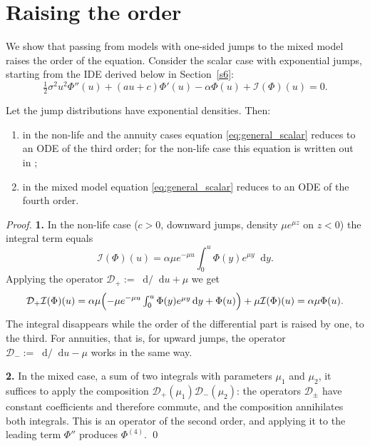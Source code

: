 \documentclass[smallextended]{svjour3}
\newcommand{\diff}{\mathop{}\!\mathrm{d}}
\begin{document}
\section{Raising the order}
\label{s4}

We show that passing from models with one-sided jumps to the mixed model
raises the order of the equation. Consider the scalar case with exponential
jumps, starting from the IDE derived below in Section~\ref{s6}:
\begin{equation}
    \label{eq:general_scalar}
    \tfrac12\sigma^2u^2\Phi''(u)+(au+c)\Phi'(u)-\alpha\Phi(u)
    +\mathcal I(\Phi)(u)=0.
\end{equation}

\begin{proposition}
\label{prop:order}
Let the jump distributions have exponential densities. Then:
\begin{enumerate}
\item in the non-life and the annuity cases equation \eqref{eq:general_scalar}
reduces to an ODE of the third order; for the non-life case this equation is
written out in \cite[\S\,5]{AntipovKabanov};
\item in the mixed model equation \eqref{eq:general_scalar} reduces to an ODE
of the fourth order.
\end{enumerate}
\end{proposition}

\begin{proof}
\textbf{1.} In the non-life case ($c>0$, downward jumps, density
$\mu e^{\mu z}$ on $z<0$) the integral term equals
$$
\mathcal I(\Phi)(u)=\alpha\mu e^{-\mu u}\int_0^u\Phi(y)e^{\mu y}\diff y .
$$
Applying the operator $\mathcal D_+:=\diff/\diff u+\mu$ we get
$$
\mathcal D_+\mathcal I(\Phi)(u)
=\alpha\mu\Bigl(-\mu e^{-\mu u}\textstyle\int_0^u\Phi(y)e^{\mu y}\diff y
+\Phi(u)\Bigr)+\mu\mathcal I(\Phi)(u)=\alpha\mu\Phi(u).
$$
The integral disappears while the order of the differential part is raised by
one, to the third. For annuities, that is, for upward jumps, the operator
$\mathcal D_-:=\diff/\diff u-\mu$ works in the same way.

\textbf{2.} In the mixed case, a sum of two integrals with parameters $\mu_1$
and $\mu_2$, it suffices to apply the composition
$\mathcal D_+(\mu_1)\mathcal D_-(\mu_2)$: the operators $\mathcal D_\pm$ have
constant coefficients and therefore commute, and the composition annihilates
both integrals. This is an operator of the second order, and applying it to the
leading term $\Phi''$ produces $\Phi^{(4)}$.
\qed
\end{proof}
\end{document}
